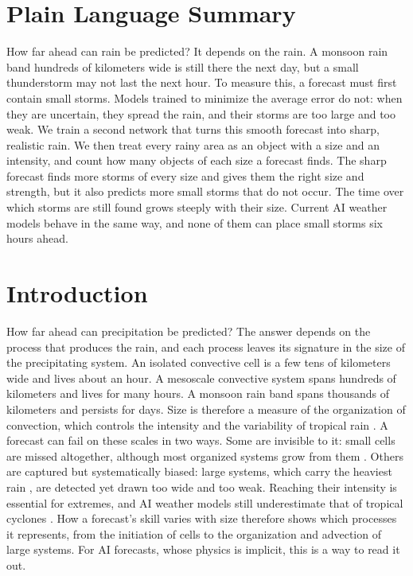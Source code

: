 \documentclass[draft]{agujournal2019}
\begin{document}
\section*{Plain Language Summary}
How far ahead can rain be predicted? It depends on the rain. A monsoon rain
band hundreds of kilometers wide is still there the next day, but a small
thunderstorm may not last the next hour. To measure this, a forecast must
first contain small storms. Models trained to minimize the average error do
not: when they are uncertain, they spread the rain, and their storms are
too large and too weak. We train a second network that turns this smooth
forecast into sharp, realistic rain. We then treat every rainy area as an
object with a size and an intensity, and count how many objects of each
size a forecast finds. The sharp forecast finds more storms of every size
and gives them the right size and strength, but it also predicts more small
storms that do not occur. The time over which storms are still found grows
steeply with their size. Current AI weather models behave in the same way,
and none of them can place small storms six hours ahead.

\section{Introduction}

How far ahead can precipitation be predicted? The answer depends on the
process that produces the rain, and each process leaves its signature in
the size of the precipitating system. An isolated convective cell is a few
tens of kilometers wide and lives about an hour. A mesoscale convective
system spans hundreds
of kilometers and lives for many hours. A monsoon rain band spans thousands of kilometers and persists for
days. Size is therefore a measure of the organization of convection, which
controls the intensity and the variability of tropical rain
\cite{muller2022, shamekh2023}. A forecast can fail on
these scales in two ways. Some are invisible to it: small cells are missed
altogether, although most organized systems grow from them
\cite{muller2022, bony2025}. Others are captured but systematically biased: large
systems, which carry the heaviest rain \cite{roca2020}, are detected yet
drawn too wide and too weak. Reaching their intensity is essential for
extremes, and AI weather models still underestimate that of tropical
cyclones \cite{bi2023}. How a forecast's skill varies with size
therefore shows which processes it represents, from the initiation of
cells to the organization and advection of large systems. For AI
forecasts, whose physics is implicit, this is a way to read it out.
\end{document}
